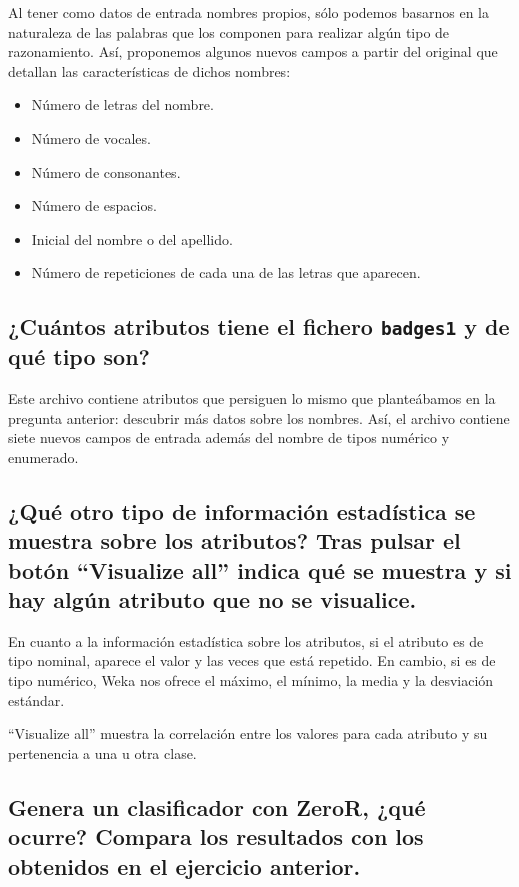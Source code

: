 \documentclass[12pt]{article}
\begin{document}
Al tener como datos de entrada nombres propios, sólo podemos basarnos en la
naturaleza de las palabras que los componen para realizar algún tipo de
razonamiento. Así, proponemos algunos nuevos campos a partir del original que
detallan las características de dichos nombres:

\begin{itemize}
    \item Número de letras del nombre.
    \item Número de vocales.
    \item Número de consonantes.
    \item Número de espacios.
    \item Inicial del nombre o del apellido.
    \item Número de repeticiones de cada una de las letras que aparecen.
\end{itemize}

\subsection*{\small ¿Cuántos atributos tiene el fichero \texttt{badges1} y de
qué tipo son?}

Este archivo contiene atributos que persiguen lo mismo que planteábamos en la
pregunta anterior: descubrir más datos sobre los nombres. Así, el archivo
contiene siete nuevos campos de entrada además del nombre de tipos numérico y
enumerado.

\subsection*{\small ¿Qué otro tipo de información estadística se muestra sobre
los atributos? Tras pulsar el botón ``Visualize all'' indica qué se muestra y
si hay algún atributo que no se visualice.}

En cuanto a la información estadística sobre los atributos, si el atributo es
de tipo nominal, aparece el valor y las veces que está repetido. En cambio, si
es de tipo numérico, Weka nos ofrece el máximo, el mínimo, la media y la
desviación estándar.

``Visualize all'' muestra la correlación entre los valores para cada atributo
y su pertenencia a una u otra clase.


\subsection*{\small Genera un clasificador con ZeroR, ¿qué ocurre? Compara los
resultados con los obtenidos en el ejercicio anterior.}
\end{document}
